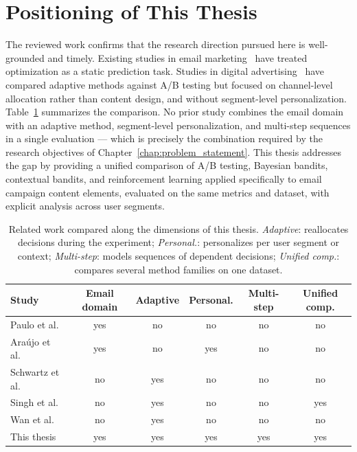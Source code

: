 \section{Positioning of This Thesis}
\label{sec:rw_positioning}

The reviewed work confirms that the research direction pursued here is well-grounded and timely. Existing studies in email marketing~\cite{paulo2022leveraging, araujo2022send} have treated optimization as a static prediction task. Studies in digital advertising~\cite{schwartz2017customer, singh2023maximize} have compared adaptive methods against A/B testing but focused on channel-level allocation rather than content design, and without segment-level personalization. Table~\ref{tab:related_work_gap} summarizes the comparison. No prior study combines the email domain with an adaptive method, segment-level personalization, and multi-step sequences in a single evaluation --- which is precisely the combination required by the research objectives of Chapter~\ref{chap:problem_statement}. This thesis addresses the gap by providing a unified comparison of A/B testing, Bayesian bandits, contextual bandits, and reinforcement learning applied specifically to email campaign content elements, evaluated on the same metrics and dataset, with explicit analysis across user segments.

\begin{table}[htbp]
    \centering
    \caption{Related work compared along the dimensions of this thesis. \emph{Adaptive}:
    reallocates decisions during the experiment; \emph{Personal.}: personalizes per user
    segment or context; \emph{Multi-step}: models sequences of dependent decisions;
    \emph{Unified comp.}: compares several method families on one dataset.}
    \label{tab:related_work_gap}
    \small
    \begin{tabular}{lccccc}
        \toprule
        Study & Email domain & Adaptive & Personal. & Multi-step & Unified comp. \\
        \midrule
        Paulo et al.~\cite{paulo2022leveraging}     & yes & no  & no  & no  & no \\
        Ara\'ujo et al.~\cite{araujo2022send}       & yes & no  & yes & no  & no \\
        Schwartz et al.~\cite{schwartz2017customer} & no  & yes & no  & no  & no \\
        Singh et al.~\cite{singh2023maximize}       & no  & yes & no  & no  & yes \\
        Wan et al.~\cite{wan2023bayesian}           & no  & yes & no  & no  & no \\
        \midrule
        This thesis                                  & yes & yes & yes & yes & yes \\
        \bottomrule
    \end{tabular}
\end{table}